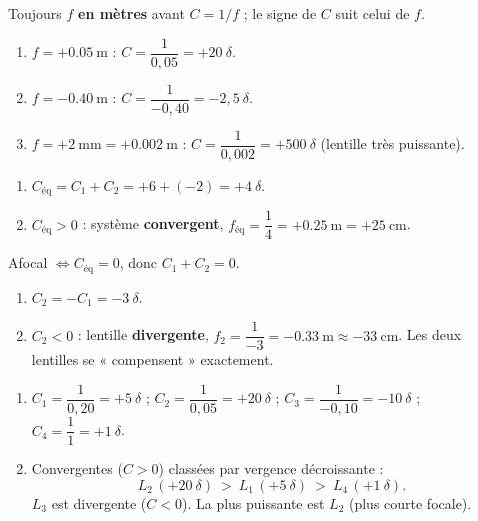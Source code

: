 \documentclass[11pt,a4paper]{article}
\begin{document}

\begin{corrige}
Toujours $f$ \textbf{en mètres} avant $C=1/f$ ; le signe de $C$ suit celui de $f$.
\begin{enumerate}[label=\alph*)]
  \item $f=+\qty{0.05}{\m}$ : $C=\dfrac{1}{0,05}=+20~\delta$.
  \item $f=-\qty{0.40}{\m}$ : $C=\dfrac{1}{-0,40}=-2{,}5~\delta$.
  \item $f=+\qty{2}{\mm}=+\qty{0.002}{\m}$ : $C=\dfrac{1}{0,002}=+500~\delta$ (lentille très puissante).
\end{enumerate}
\end{corrige}

\begin{corrige}
\begin{enumerate}[label=\alph*)]
  \item $C_{\text{éq}}=C_1+C_2=+6+(-2)=+4~\delta$.
  \item $C_{\text{éq}}>0$ : système \textbf{convergent},
        $f_{\text{éq}}=\dfrac{1}{4}=+\qty{0.25}{\m}=+\qty{25}{\cm}$.
\end{enumerate}
\end{corrige}

\begin{corrige}
Afocal $\Leftrightarrow C_{\text{éq}}=0$, donc $C_1+C_2=0$.
\begin{enumerate}[label=\alph*)]
  \item $C_2=-C_1=-3~\delta$.
  \item $C_2<0$ : lentille \textbf{divergente}, $f_2=\dfrac{1}{-3}=-\qty{0.33}{\m}\approx-\qty{33}{\cm}$.
        Les deux lentilles se « compensent » exactement.
\end{enumerate}
\end{corrige}

\begin{corrige}
\begin{enumerate}[label=\alph*)]
  \item $C_1=\dfrac{1}{0,20}=+5~\delta$ ; $C_2=\dfrac{1}{0,05}=+20~\delta$ ;
        $C_3=\dfrac{1}{-0,10}=-10~\delta$ ; $C_4=\dfrac{1}{1}=+1~\delta$.
  \item Convergentes ($C>0$) classées par vergence décroissante :
        \[ L_2\,(+20~\delta)\ >\ L_1\,(+5~\delta)\ >\ L_4\,(+1~\delta). \]
        $L_3$ est divergente ($C<0$). La plus puissante est $L_2$ (plus courte focale).
\end{enumerate}
\end{corrige}
\end{document}
